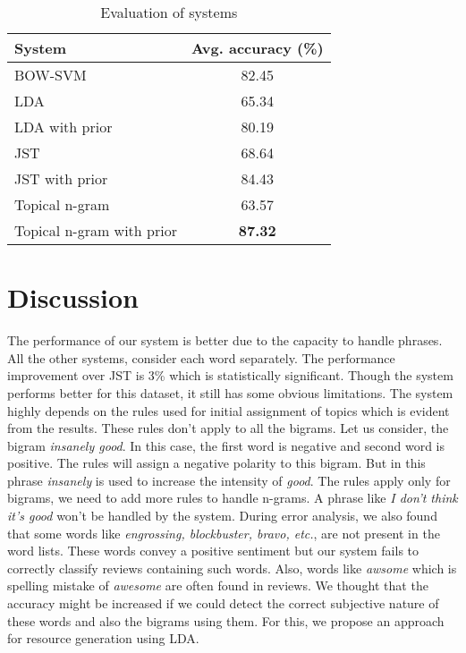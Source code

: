 \documentclass[11pt]{article}
\begin{document}
\begin{table}[h]
\begin{center}
\begin{tabular}{|l|c|}
\hline \bf System & \bf Avg. accuracy (\%)\\ \hline
BOW-SVM & 82.45\\
LDA & 65.34\\
LDA with prior & 80.19\\
JST & 68.64\\
JST with prior & 84.43\\
Topical n-gram & 63.57\\
Topical n-gram with prior & \textbf{87.32}\\
\hline
\end{tabular}
\end{center}
\caption{\label{result-table} Evaluation of systems}
\end{table}

\section{Discussion}\label{discussion}

The performance of our system is better due to the capacity to handle phrases. All the other systems, consider each word
separately. The performance improvement over JST is 3\% which is statistically significant. Though the system performs
better for this dataset, it still has some obvious limitations. The system highly depends on the rules used for
initial assignment of topics which is evident from the results. These rules don't apply to all the bigrams. Let us
consider, the bigram \textit{insanely good}. In this case, the first word is negative and second word is positive. The rules
will assign a negative polarity to this bigram. But in this phrase \textit{insanely} is used to increase the intensity of 
\textit{good}. The rules apply only for bigrams, we need to add more rules to handle n-grams. A phrase like \textit{I don't
think it's good} won't be handled by the system. During error analysis, we also found that some words like \textit{engrossing,
blockbuster, bravo, etc.}, are not present in the word lists. These words convey a positive sentiment but our system fails
to correctly classify reviews containing such words. Also, words like \textit{awsome} which is spelling mistake of \textit{awesome}
are often found in reviews. We thought that the accuracy might be increased if we could detect the correct subjective
nature of these words and also the bigrams using them. For this, we propose an approach for resource generation using LDA.
\end{document}
